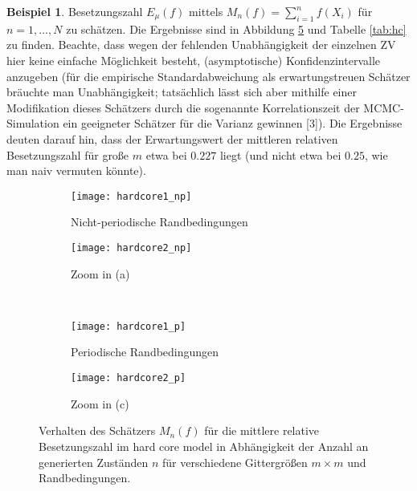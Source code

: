 \documentclass[twoside]{article}
\theoremstyle{definition}
\newtheorem{example}[theorem]{Beispiel}
\begin{document}
\begin{example}
Besetzungszahl $E_\mu(f)$ mittels $M_n(f) = \sum_{i=1}^n f(X_i)$ für $n = 1, \dots , N$ zu schätzen. Die Ergebnisse sind in Abbildung \ref{fig:hc} und Tabelle \ref{tab:hc} zu finden. Beachte, dass wegen der fehlenden Unabhängigkeit der einzelnen ZV hier keine einfache Möglichkeit besteht, (asymptotische) Konfidenzintervalle anzugeben (für die empirische Standardabweichung als erwartungstreuen Schätzer bräuchte man Unabhängigkeit; tatsächlich lässt sich aber mithilfe einer Modifikation dieses Schätzers durch die sogenannte Korrelationszeit der MCMC-Simulation ein geeigneter Schätzer für die Varianz gewinnen [3]). Die Ergebnisse deuten darauf hin, dass der Erwartungswert der mittleren relativen Besetzungszahl für große $m$ etwa bei $0.227$ liegt (und nicht etwa bei $0.25$, wie man naiv vermuten könnte).
\end{example}
\begin{figure}
\centering
	\begin{subfigure}[t]{0.49 \textwidth}
	\vskip 0pt
		\centering
		\texttt{[image: hardcore1\_np]}
		\caption{Nicht-periodische Randbedingungen}
		\label{fig:hardcore1_np}		
	\end{subfigure}
	\begin{subfigure}[t]{0.49 \textwidth}
	\vskip 0pt
		\centering
		\texttt{[image: hardcore2\_np]}
		\caption{Zoom in (a)}\label{fig:hardcore2_np}
	\end{subfigure}\\
		\begin{subfigure}[t]{0.49 \textwidth}
	\vskip 0pt
		\centering
		\texttt{[image: hardcore1\_p]}
		\caption{Periodische Randbedingungen}
		\label{fig:hardcore1_p}		
	\end{subfigure}
	\begin{subfigure}[t]{0.49 \textwidth}
	\vskip 0pt
		\centering
		\texttt{[image: hardcore2\_p]}
		\caption{Zoom in (c)}	
	\label{fig:hardcore2_p}
	\end{subfigure}
\caption{Verhalten des Schätzers $M_n(f)$ für die mittlere relative Besetzungszahl im hard core model in Abhängigkeit der Anzahl an generierten Zuständen $n$ für verschiedene Gittergrößen $m \times m$ und Randbedingungen.}
\label{fig:hc}
\end{figure}
\end{document}
